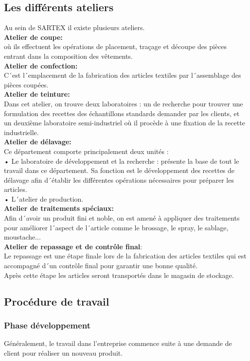 \documentclass[12pt, a4paper]{thesis}
\begin{document}
\subsection{Les différents ateliers}
Au sein de SARTEX il existe plusieurs ateliers.\\
\textbf{Atelier de coupe:}\\ où ils effectuent les opérations de placement, traçage et découpe des pièces entrant dans la composition des vêtements.\\
\textbf{Atelier de confection:}\\ C´est l´emplacement de la fabrication des articles textiles par l´assemblage des pièces coupées.\\
\textbf{Atelier de teinture:}\\ 
Dans cet atelier, on trouve deux laboratoires : un de recherche pour trouver une formulation des recettes des échantillons standards demander par les clients, et un deuxième laboratoire semi-industriel où il procède à une fixation de la recette industrielle.\\
\textbf{Atelier de délavage:}\\
Ce département comporte principalement deux unités : \\
• Le laboratoire de développement et la recherche : présente la base de tout le travail dans ce département. Sa fonction est le développement des recettes de délavage afin d´établir les différentes opérations nécessaires pour préparer les articles.\\
• L´atelier de production.\\
\textbf{Atelier de traitements spéciaux:}\\Afin d´avoir un produit fini et noble, on est amené à appliquer des traitements pour améliorer l´aspect de l´article comme le brossage, le spray, le sablage, moustache...\\
\textbf{Atelier de repassage et de contrôle final}:\\Le repassage est une étape finale lors de la fabrication des articles textiles qui est accompagné d´un contrôle final pour garantir une bonne qualité.\\ Après cette étape les articles seront transportés dans le magasin de stockage.\\ 

\subsection{Procédure de travail}
\subsubsection{Phase développement }
Généralement, le travail dans l’entreprise commence suite à une demande de client pour réaliser un nouveau produit. 
\end{document}
